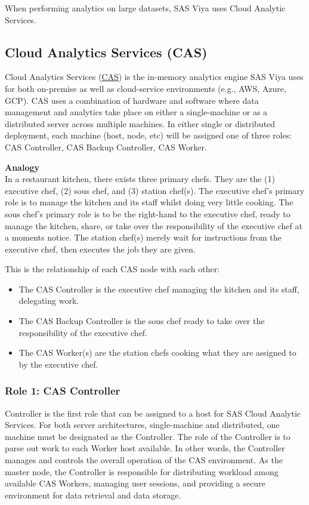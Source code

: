 When performing analytics on large datasets, SAS Viya uses Cloud Analytic Services.

\subsection{Cloud Analytics Services (CAS)}
Cloud Analytics Services (\href{https://documentation.sas.com/doc/en/calcdc/3.3/calserverscas/n05000viyaservers000000admin.htm}{CAS}) is the in-memory analytics engine SAS Viya uses for both on-premise as well as cloud-service environments (e.g., AWS, Azure, GCP). CAS uses a combination of hardware and software where data management and analytics take place on either a single-machine or as a distributed server across multiple machines. In either single or distributed deployment, each machine (host, node, etc) will be assigned one of three roles: CAS Controller, CAS Backup Controller, CAS Worker.

\textbf{Analogy}
\\
In a restaurant kitchen, there exists three primary chefs. They are the (1) executive chef, (2) sous chef, and (3) station chef(s). The executive chef's primary role is to manage the kitchen and its staff whilst doing very little cooking. The sous chef's primary role is to be the right-hand to the executive chef, ready to manage the kitchen, share, or take over the responsibility of the executive chef at a moments notice. The station chef(s) merely wait for instructions from the executive chef, then executes the job they are given. 

This is the relationship of each CAS node with each other:
\begin{itemize}
    \item The CAS Controller is the executive chef managing the kitchen and its staff, delegating work.
    \item The CAS Backup Controller is the sous chef ready to take over the responsibility of the executive chef. 
    \item The CAS Worker(s) are the station chefs cooking what they are assigned to by the executive chef. 
\end{itemize}

\subsubsection{Role 1: CAS Controller}
Controller is the first role that can be assigned to a host for SAS Cloud Analytic Services. For both server architectures, single-machine and distributed, one machine must be designated as the Controller. The role of the Controller is to parse out work to each Worker host available. In other words, the Controller manages and controls the overall operation of the CAS environment. As the master node, the Controller is responsible for distributing workload among available CAS Workers, managing user sessions, and providing a secure environment for data retrieval and data storage. 


